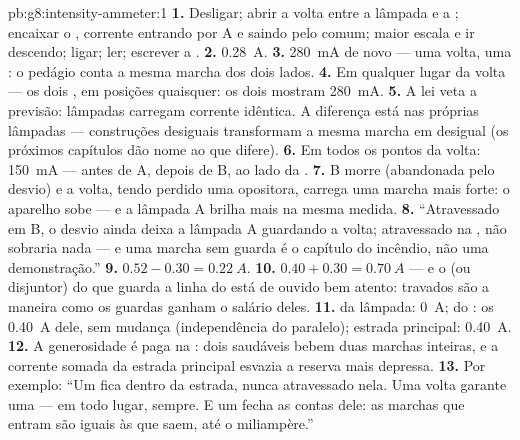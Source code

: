 \begin{solution}{pb:g8:intensity-ammeter:1}
\textbf{1.} Desligar; abrir a volta entre a lâmpada e a ;
encaixar o , corrente entrando por \unit{A} e saindo pelo
comum; maior escala e ir descendo; ligar; ler; escrever a .
\textbf{2.} \qty{0.28}{A}.
\textbf{3.} \qty{280}{mA} de novo --- uma volta, uma : o
pedágio conta a mesma marcha dos dois lados.
\textbf{4.} Em qualquer lugar da volta --- os dois , em
posições quaisquer: os dois mostram \qty{280}{mA}.
\textbf{5.} A lei veta a previsão: lâmpadas  carregam
corrente idêntica. A diferença está nas próprias lâmpadas ---
construções desiguais transformam a mesma marcha em  desigual (os
próximos capítulos dão nome ao que difere).
\textbf{6.} Em todos os pontos da volta: \qty{150}{mA} --- antes de
A, depois de B, ao lado da .
\textbf{7.} B morre (abandonada pelo desvio) e a volta, tendo perdido
uma opositora, carrega uma marcha mais forte: o aparelho sobe --- e a
lâmpada A brilha mais na mesma medida.
\textbf{8.} ``Atravessado em B, o desvio ainda deixa a lâmpada A
guardando a volta; atravessado na , não sobraria nada --- e uma
marcha sem guarda é o capítulo do incêndio, não uma demonstração.''
\textbf{9.} $0.52 - 0.30 = \qty{0.22}{A}$.
\textbf{10.} $0.40 + 0.30 = \qty{0.70}{A}$ --- e o  (ou
disjuntor) do  que guarda a linha do  está de ouvido bem
atento:  travados são a maneira como os guardas ganham o
salário deles.
\textbf{11.}  da lâmpada: \qty{0}{A};  do : os
\qty{0.40}{A} dele, sem mudança (independência do paralelo); estrada
principal: \qty{0.40}{A}.
\textbf{12.} A generosidade é paga na : dois  saudáveis
bebem duas marchas inteiras, e a corrente somada da estrada principal
esvazia a reserva mais depressa.
\textbf{13.} Por exemplo: ``Um  fica dentro da estrada,
nunca atravessado nela. Uma volta garante uma  --- em todo
lugar, sempre. E um  fecha as contas dele: as marchas que entram
são iguais às que saem, até o miliampère.''
\end{solution}
